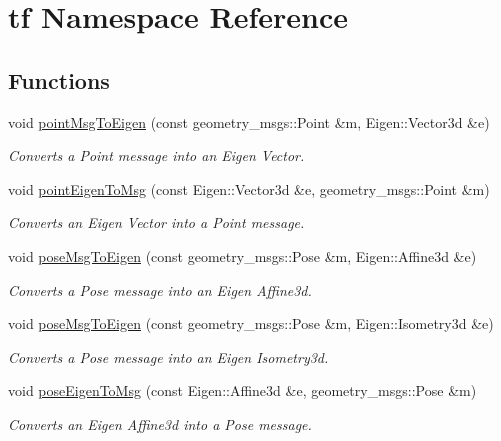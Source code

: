 \hypertarget{namespacetf}{\section{tf Namespace Reference}
\label{namespacetf}
}
\subsection*{Functions}
\begin{DoxyCompactItemize}
\item 
void \hyperlink{namespacetf_a40971036bc6c036e2d46038e1ea2d449}{point\-Msg\-To\-Eigen} (const geometry\-\_\-msgs\-::\-Point \&m, Eigen\-::\-Vector3d \&e)
\begin{DoxyCompactList}\small\item\em Converts a Point message into an Eigen Vector. \end{DoxyCompactList}\item 
void \hyperlink{namespacetf_ad5493652c9ba9799134f4e4e2fab47f1}{point\-Eigen\-To\-Msg} (const Eigen\-::\-Vector3d \&e, geometry\-\_\-msgs\-::\-Point \&m)
\begin{DoxyCompactList}\small\item\em Converts an Eigen Vector into a Point message. \end{DoxyCompactList}\item 
void \hyperlink{namespacetf_a54148a9462e081ab7566a20cd745b195}{pose\-Msg\-To\-Eigen} (const geometry\-\_\-msgs\-::\-Pose \&m, Eigen\-::\-Affine3d \&e)
\begin{DoxyCompactList}\small\item\em Converts a Pose message into an Eigen Affine3d. \end{DoxyCompactList}\item 
void \hyperlink{namespacetf_a465ab06f9a1dc34717fb5dd462f5c2ca}{pose\-Msg\-To\-Eigen} (const geometry\-\_\-msgs\-::\-Pose \&m, Eigen\-::\-Isometry3d \&e)
\begin{DoxyCompactList}\small\item\em Converts a Pose message into an Eigen Isometry3d. \end{DoxyCompactList}\item 
void \hyperlink{namespacetf_aad8e6131b3c1439b674e7dd51e7da3b3}{pose\-Eigen\-To\-Msg} (const Eigen\-::\-Affine3d \&e, geometry\-\_\-msgs\-::\-Pose \&m)
\begin{DoxyCompactList}\small\item\em Converts an Eigen Affine3d into a Pose message. \end{DoxyCompactList}\item 

\end{DoxyCompactItemize}
